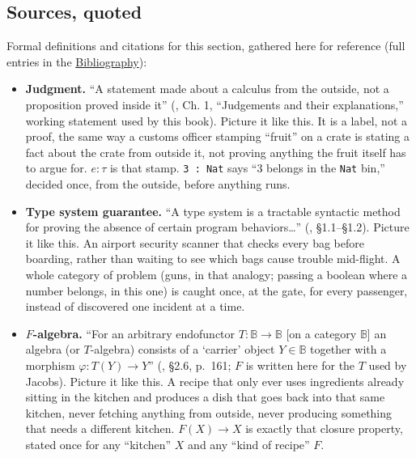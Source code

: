 \begin{center}

\end{center}

\subsection{Sources, quoted}\label{sec:01-basics:01-everything-has-a-type:4}

Formal definitions and citations for this section, gathered here for reference (full entries in the \hyperref[sec:root:bibliography:1]{Bibliography}):

\begin{itemize}
\tightlist
\item
  \textbf{Judgment.} ``A statement made about a calculus from the outside, not a proposition proved inside it'' (\cite{MartinLof1984}, Ch. 1, ``Judgements and their explanations,'' working statement used by this book). Picture it like this. It is a label, not a proof, the same way a customs officer stamping ``fruit'' on a crate is stating a fact about the crate from outside it, not proving anything the fruit itself has to argue for. \(e : \tau\) is that stamp. \texttt{3 : Nat} says ``3 belongs in the \texttt{Nat} bin,'' decided once, from the outside, before anything runs.
\item
  \textbf{Type system guarantee.} ``A type system is a tractable syntactic method for proving the absence of certain program behaviors\ldots{}'' (\cite{Pierce2002}, §1.1--§1.2). Picture it like this. An airport security scanner that checks every bag before boarding, rather than waiting to see which bags cause trouble mid-flight. A whole category of problem (guns, in that analogy; passing a boolean where a number belongs, in this one) is caught once, at the gate, for every passenger, instead of discovered one incident at a time.
\item
  \textbf{\(F\)-algebra.} ``For an arbitrary endofunctor \(T : \mathbb{B} \to
  \mathbb{B}\) {[}on a category \(\mathbb{B}\){]} an algebra (or \(T\)-algebra) consists of a `carrier' object \(Y \in \mathbb{B}\) together with a morphism \(\varphi : T(Y) \to Y\)'' (\cite{Jacobs1999}, §2.6, p.~161; \(F\) is written here for the \(T\) used by Jacobs). Picture it like this. A recipe that only ever uses ingredients already sitting in the kitchen and produces a dish that goes back into that same kitchen, never fetching anything from outside, never producing something that needs a different kitchen. \(F(X) \to X\) is exactly that closure property, stated once for any ``kitchen'' \(X\) and any ``kind of recipe'' \(F\).

\end{itemize}
